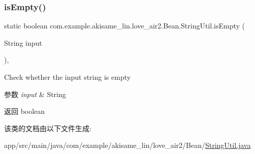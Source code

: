 \mbox{\label{classcom_1_1example_1_1akisame__lin_1_1love__air2_1_1_bean_1_1_string_util_a3e9141022773ff6999f281e02319497e}} 
\subsubsection{\texorpdfstring{isEmpty()}{isEmpty()}}
{\footnotesize\ttfamily static boolean com.\+example.\+akisame\+\_\+lin.\+love\+\_\+air2.\+Bean.\+String\+Util.\+is\+Empty (\begin{DoxyParamCaption}\item[{String}]{input }\end{DoxyParamCaption})\hspace{0.3cm}{\ttfamily [inline]}, {\ttfamily [static]}}

Check whether the input string is empty


\begin{DoxyParams}{参数}
{\em input} & String \\
\hline
\end{DoxyParams}
\begin{DoxyReturn}{返回}
boolean 
\end{DoxyReturn}


该类的文档由以下文件生成\+:\begin{DoxyCompactItemize}
\item 
app/src/main/java/com/example/akisame\+\_\+lin/love\+\_\+air2/\+Bean/\mbox{\hyperlink{_string_util_8java}{String\+Util.\+java}}\end{DoxyCompactItemize}
